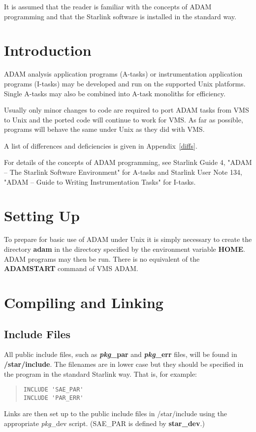It is assumed that the reader is familiar with the concepts of ADAM 
programming and that the Starlink software is installed in the standard way.

  \setlength{\parskip}{0mm}
  \tableofcontents
  \setlength{\parskip}{\medskipamount}
  \markright{\stardocname}

\newpage
\section{Introduction}
\label{intro}
ADAM analysis application programs (A-tasks) or instrumentation application
programs (I-tasks) may be developed and run on the supported Unix platforms. 
Single A-tasks may also be combined into A-task monoliths for efficiency.

Usually only minor changes to code  are required to port ADAM tasks from VMS
to Unix and the ported code will continue to work for VMS.
As far as possible, programs will behave the same under Unix as they did with
VMS.

A list of differences and deficiencies is given in Appendix~\ref{diffs}.

For details of the concepts of ADAM programming, see Starlink Guide 4, 
"ADAM -- The Starlink Software Environment" for A-tasks and Starlink User Note
134, "ADAM -- Guide to Writing Instrumentation Tasks" for I-tasks.

\section{Setting Up}
To prepare for basic use of ADAM under Unix it is simply necessary to create 
the directory {\bf adam} in the directory specified by the environment 
variable {\bf HOME}. 
ADAM programs may then be run. 
There is no equivalent of the {\bf ADAMSTART}
command of VMS ADAM.

\section{Compiling and Linking}
\subsection{Include Files}
\label{incs}
All public include files, such as {\bf {\em pkg}\_par} and
{\bf {\em pkg}\_err} files, will be found in {\bf /star/include}.
The filenames are in lower case but they should be specified in the program 
in the standard Starlink way. That is, for example:
\begin{quote} \begin{verbatim}
INCLUDE 'SAE_PAR'
INCLUDE 'PAR_ERR'
\end{verbatim} \end{quote}
Links are then set up to the public include files in /star/include using the
appropriate {\em pkg}\_dev script. (SAE\_PAR is defined by {\bf star\_dev}.)

